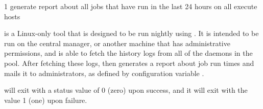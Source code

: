 \begin{ManPage}{\label{man-pool-job-report}}{1}
{generate report about all jobs that have run in the last 24 hours on
all execute hosts}
\Synopsis



\Description

 is a Linux-only 
tool that is designed to be run nightly using .
It is intended to be run on the central manager, 
or another machine that has administrative permissions,
and is able to fetch the  history logs
from all of the  daemons in the pool.
After fetching these logs, 
 then generates a report about job run times
and mails it to administrators, 
as defined by configuration variable .

\ExitStatus

 will exit with a status value of 0 (zero) 
upon success,
and it will exit with the value 1 (one) upon failure.

\end{ManPage}
